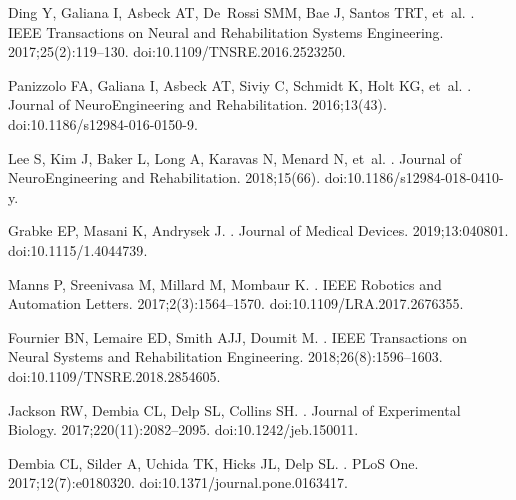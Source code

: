 \documentclass[10pt,letterpaper]{article}
\begin{document}
\begin{thebibliography}{10}
Ding Y, Galiana I, Asbeck AT, De~Rossi SMM, Bae J, Santos TRT, et~al.
.
\newblock IEEE Transactions on Neural and Rehabilitation Systems Engineering.
  2017;25(2):119--130.
\newblock doi:{10.1109/TNSRE.2016.2523250}.

Panizzolo FA, Galiana I, Asbeck AT, Siviy C, Schmidt K, Holt KG, et~al.
.
\newblock Journal of NeuroEngineering and Rehabilitation. 2016;13(43).
\newblock doi:{10.1186/s12984-016-0150-9}.

Lee S, Kim J, Baker L, Long A, Karavas N, Menard N, et~al.
.
\newblock Journal of NeuroEngineering and Rehabilitation. 2018;15(66).
\newblock doi:{10.1186/s12984-018-0410-y}.

Grabke EP, Masani K, Andrysek J.
.
\newblock Journal of Medical Devices. 2019;13:040801.
\newblock doi:{10.1115/1.4044739}.

Manns P, Sreenivasa M, Millard M, Mombaur K.
.
\newblock IEEE Robotics and Automation Letters. 2017;2(3):1564--1570.
\newblock doi:{10.1109/LRA.2017.2676355}.

Fournier BN, Lemaire ED, Smith AJJ, Doumit M.
.
\newblock IEEE Transactions on Neural Systems and Rehabilitation Engineering.
  2018;26(8):1596--1603.
\newblock doi:{10.1109/TNSRE.2018.2854605}.

Jackson RW, Dembia CL, Delp SL, Collins SH.
.
\newblock Journal of Experimental Biology. 2017;220(11):2082--2095.
\newblock doi:{10.1242/jeb.150011}.

Dembia CL, Silder A, Uchida TK, Hicks JL, Delp SL.
.
\newblock PLoS One. 2017;12(7):e0180320.
\newblock doi:{10.1371/journal.pone.0163417}.


\end{thebibliography}
\end{document}
